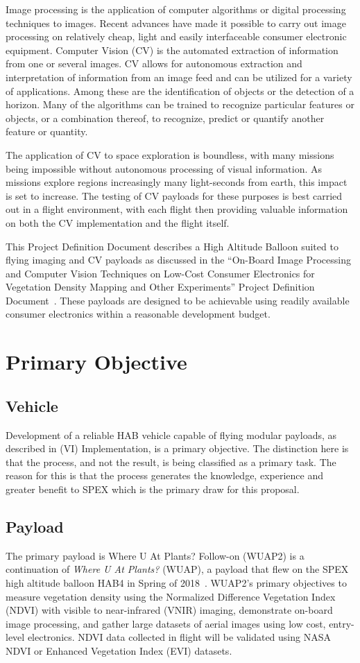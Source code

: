 \documentclass[conference]{IEEEtran} %
\begin{document}
Image processing is the application of computer algorithms or digital processing techniques to images. Recent advances have made it possible to carry out image processing on relatively cheap, light and easily interfaceable consumer electronic equipment. Computer Vision (CV) is the automated extraction of information from one or several images. CV allows for autonomous extraction and interpretation of information from an image feed and can be utilized for a variety of applications. Among these are the identification of objects or the detection of a horizon. Many of the algorithms can be trained to recognize particular features or objects, or a combination thereof, to recognize, predict or quantify another feature or quantity.

The application of CV to space exploration is boundless, with many missions being impossible without autonomous processing of visual information. As missions explore regions increasingly many light-seconds from earth, this impact is set to increase. The testing of CV payloads for these purposes is best carried out in a flight environment, with each flight then providing valuable information on both the CV implementation and the flight itself. 

This Project Definition Document describes a High Altitude Balloon suited to flying imaging and CV payloads as discussed in the “On-Board Image Processing and Computer Vision Techniques on Low-Cost Consumer Electronics for Vegetation Density Mapping and Other Experiments” Project Definition Document~\cite{habcvpdd}. These payloads are designed to be achievable using readily available consumer electronics within a reasonable development budget. 

\section{Primary Objective}
\subsection{Vehicle}
Development of a reliable HAB vehicle capable of flying modular payloads, as described in (VI) Implementation, is a primary objective. The distinction here is that the process, and not the result, is being classified as a primary task. The reason for this is that the process generates the knowledge, experience and greater benefit to SPEX which is the primary draw for this proposal.

\subsection{Payload}
The primary payload is Where U At Plants? Follow-on (WUAP2) is a continuation of \textit{Where U At Plants?} (WUAP), a payload that flew on the SPEX high altitude balloon  HAB4 in Spring of 2018~\cite{wuaphab4}. WUAP2’s primary objectives to measure vegetation density using the Normalized Difference Vegetation Index (NDVI) with visible to near-infrared (VNIR) imaging, demonstrate on-board image processing, and gather large datasets of aerial images using low cost, entry-level electronics. NDVI data collected in flight will be validated using NASA NDVI or Enhanced Vegetation Index (EVI) datasets.
\end{document}
